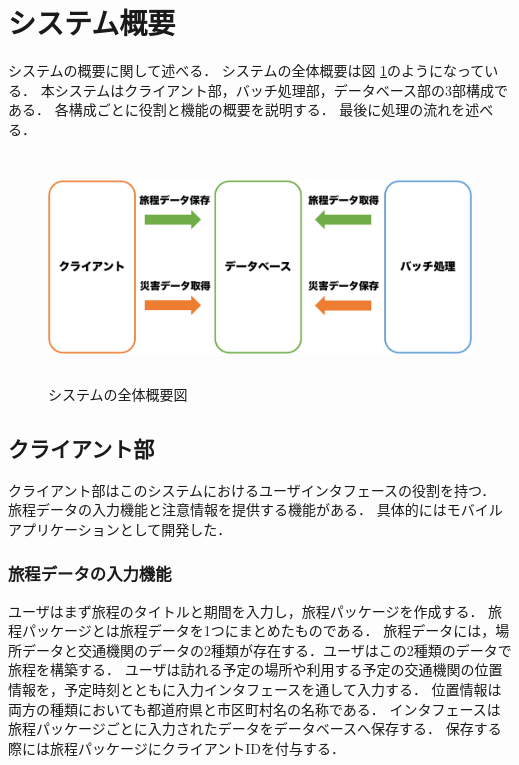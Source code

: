 \section{システム概要}
システムの概要に関して述べる．
システムの全体概要は図 \ref{fig:system_summary}のようになっている．
本システムはクライアント部，バッチ処理部，データベース部の3部構成である．
各構成ごとに役割と機能の概要を説明する．
最後に処理の流れを述べる．

\begin{figure}[h]
  \centering
  \includegraphics[height=6cm]{figure31.pdf}
  \caption{システムの全体概要図}
  \label{fig:system_summary}
\end{figure}

\subsection{クライアント部}
クライアント部はこのシステムにおけるユーザインタフェースの役割を持つ．
旅程データの入力機能と注意情報を提供する機能がある．
具体的にはモバイルアプリケーションとして開発した．

\subsubsection{旅程データの入力機能}
ユーザはまず旅程のタイトルと期間を入力し，旅程パッケージを作成する．
旅程パッケージとは旅程データを1つにまとめたものである．
旅程データには，場所データと交通機関のデータの2種類が存在する．ユーザはこの2種類のデータで旅程を構築する．
ユーザは訪れる予定の場所や利用する予定の交通機関の位置情報を，予定時刻とともに入力インタフェースを通して入力する．
位置情報は両方の種類においても都道府県と市区町村名の名称である．
インタフェースは旅程パッケージごとに入力されたデータをデータベースへ保存する．
保存する際には旅程パッケージにクライアントIDを付与する．

